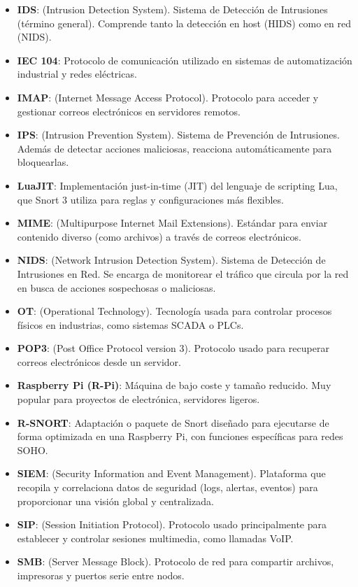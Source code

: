\documentclass[11pt,a4paper,twoside]{report}
\begin{document}
\begin{itemize}
	\item \textbf{IDS}: (Intrusion Detection System). Sistema de Detección de Intrusiones (término general). Comprende tanto la detección en host (HIDS) como en red (NIDS).
	\item \textbf{IEC 104}: Protocolo de comunicación utilizado en sistemas de automatización industrial y redes eléctricas.
	\item \textbf{IMAP}: (Internet Message Access Protocol). Protocolo para acceder y gestionar correos electrónicos en servidores remotos.
	\item \textbf{IPS}: (Intrusion Prevention System). Sistema de Prevención de Intrusiones. Además de detectar acciones maliciosas, reacciona automáticamente para bloquearlas.
	\item \textbf{LuaJIT}: Implementación just-in-time (JIT) del lenguaje de scripting Lua, que Snort 3 utiliza para reglas y configuraciones más flexibles.
	\item \textbf{MIME}: (Multipurpose Internet Mail Extensions). Estándar para enviar contenido diverso (como archivos) a través de correos electrónicos.
	\item \textbf{NIDS}: (Network Intrusion Detection System). Sistema de Detección de Intrusiones en Red. Se encarga de monitorear el tráfico que circula por la red en busca de acciones sospechosas o maliciosas.
	\item \textbf{OT}: (Operational Technology). Tecnología usada para controlar procesos físicos en industrias, como sistemas SCADA o PLCs.
	\item \textbf{POP3}: (Post Office Protocol version 3). Protocolo usado para recuperar correos electrónicos desde un servidor.
	\item \textbf{Raspberry Pi (R-Pi)}: Máquina de bajo coste y tamaño reducido. Muy popular para proyectos de electrónica, servidores ligeros.
	\item \textbf{R-SNORT}: Adaptación o paquete de Snort diseñado para ejecutarse de forma optimizada en una Raspberry Pi, con funciones específicas para redes SOHO.
	\item \textbf{SIEM}: (Security Information and Event Management). Plataforma que recopila y correlaciona datos de seguridad (logs, alertas, eventos) para proporcionar una visión global y centralizada.
	\item \textbf{SIP}: (Session Initiation Protocol). Protocolo usado principalmente para establecer y controlar sesiones multimedia, como llamadas VoIP.
	\item \textbf{SMB}: (Server Message Block). Protocolo de red para compartir archivos, impresoras y puertos serie entre nodos.

\end{itemize}
\end{document}
